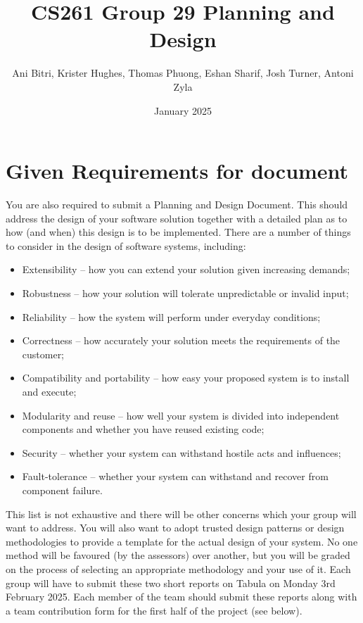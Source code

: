 \documentclass{article}
\title{CS261 Group 29 Planning and Design}
\author{Ani Bitri, Krister Hughes, Thomas Phuong, Eshan Sharif, Josh Turner, Antoni Zyla}
\date{January 2025}
\begin{document}
\maketitle
\tableofcontents

\section{Given Requirements for document}
You are also required to submit a Planning and Design Document. This should address the design of your software solution together with a detailed plan as to how (and when) this design is to be implemented. There are a number of things to consider in the design of software systems, including:

\begin{itemize}
    \item Extensibility – how you can extend your solution given increasing demands;
    \item Robustness – how your solution will tolerate unpredictable or invalid input;
    \item Reliability – how the system will perform under everyday conditions;
    \item Correctness – how accurately your solution meets the requirements of the customer;
    \item Compatibility and portability – how easy your proposed system is to install and execute;
    \item Modularity and reuse – how well your system is divided into independent components and whether you have reused existing code;
    \item Security – whether your system can withstand hostile acts and influences;
    \item Fault-tolerance – whether your system can withstand and recover from component failure.
\end{itemize}

This list is not exhaustive and there will be other concerns which your group will want to address. You will also want to adopt trusted design patterns or design methodologies to provide a template for the actual design of your system. No one method will be favoured (by the assessors) over another, but you will be graded on the process of selecting an appropriate methodology and your use of it.
Each group will have to submit these two short reports on Tabula on Monday 3rd February 2025. Each member of the team should submit these reports along with a team contribution form for the first half of the project (see below). 
\end{document}
